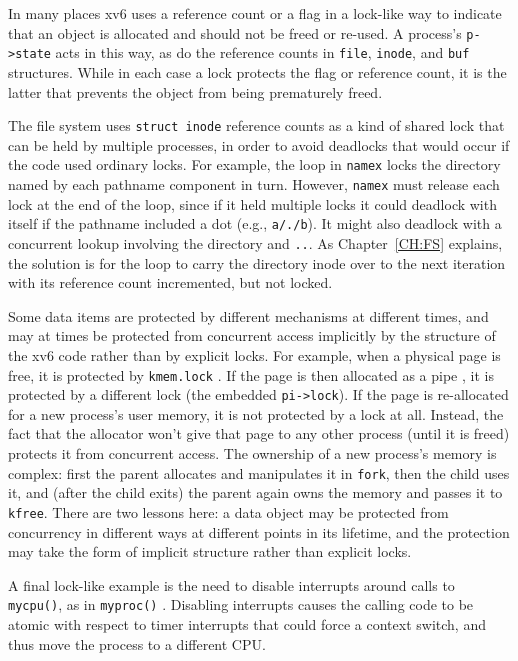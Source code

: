 In many places xv6 uses a reference count or a flag in a lock-like way
to indicate that an object is allocated and should not be freed
or re-used. A process's {\tt p->state} acts in this way, as do the
reference counts in {\tt file}, {\tt inode}, and {\tt buf} structures.
While in each case a lock protects the flag or reference count, it is
the latter that prevents the object from being prematurely freed.

The file system uses {\tt struct inode} reference counts as a kind of
shared lock that can be held by multiple processes, in order to avoid
deadlocks that would occur if the code used ordinary locks. For
example, the loop in {\tt namex}  locks
the directory named by each pathname component in turn. However, {\tt namex}
must release each lock at the end of the loop, since if it
held multiple locks it could deadlock with itself if the pathname
included a dot (e.g., {\tt a/./b}). It might also deadlock with a
concurrent lookup involving the directory and {\tt ..}. As
Chapter~\ref{CH:FS} explains, the solution is for the loop to carry
the directory inode over to the next iteration with its reference
count incremented, but not locked.

Some data items are protected by different mechanisms at different
times, and may at times be protected from concurrent access implicitly
by the structure of the xv6 code rather than by explicit locks. For
example, when a physical page is free, it is protected by \texttt{kmem.lock}
. If the page is then
allocated as a pipe , it is
protected by a different lock (the embedded \lstinline{pi->lock}). If the page
is re-allocated for a new process's user memory, it is not protected by a
lock at all. Instead, the fact that the allocator won't give that page
to any other process (until it is freed) protects it from concurrent
access. 
The ownership of a new process's memory is complex:
first the parent allocates and
manipulates it in {\tt fork}, then the child uses it, and (after the
child exits) the parent again owns the memory and passes it to {\tt
  kfree}. There are two lessons here: a data object may be protected
from concurrency in different ways at different points in its
lifetime, and the protection may take the form of implicit structure
rather than explicit locks.

A final lock-like example is the need to disable interrupts around
calls to {\tt mycpu()}, as in {\tt myproc()}
. Disabling
interrupts causes the calling code to be atomic with respect to timer
interrupts that could force a context switch, and thus move the
process to a different CPU.

